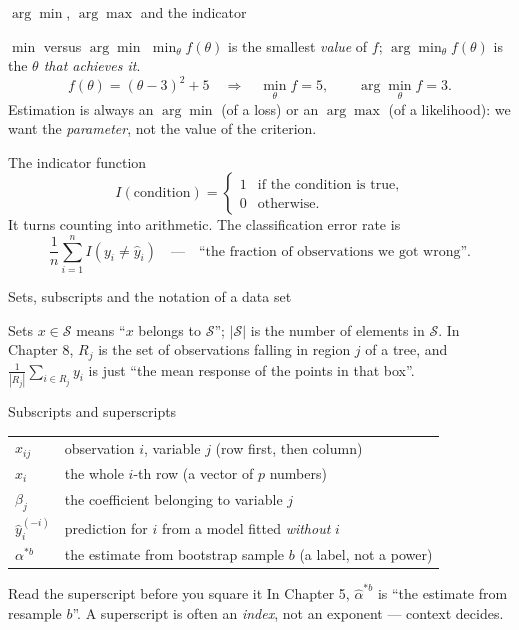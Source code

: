 \documentclass[aspectratio=169,11pt]{beamer}
\begin{document}
\begin{frame}{$\arg\min$, $\arg\max$ and the indicator}
  \footnotesize
  \begin{block}{$\min$ versus $\arg\min$}
    $\min_\theta f(\theta)$ is the smallest \emph{value} of $f$;
    $\arg\min_\theta f(\theta)$ is the \emph{$\theta$ that achieves it}.
    \[
      f(\theta) = (\theta-3)^2 + 5
      \quad\Longrightarrow\quad
      \min_\theta f = 5, \qquad \arg\min_\theta f = 3 .
    \]
    Estimation is always an $\arg\min$ (of a loss) or an $\arg\max$ (of a
    likelihood): we want the \emph{parameter}, not the value of the criterion.
  \end{block}
  \begin{block}{The indicator function}
    \[
      I(\text{condition}) =
      \begin{cases} 1 & \text{if the condition is true},\\ 0 & \text{otherwise.}\end{cases}
    \]
    It turns counting into arithmetic. The classification error rate is
    \[
      \frac{1}{n}\sum_{i=1}^{n} I(y_i \ne \hat y_i)
      \quad\text{---}\quad
      \text{``the fraction of observations we got wrong''.}
    \]
  \end{block}
\end{frame}

\begin{frame}{Sets, subscripts and the notation of a data set}
  \footnotesize
  \begin{block}{Sets}
    $x \in \mathcal{S}$ means ``$x$ belongs to $\mathcal{S}$'';
    $|\mathcal{S}|$ is the number of elements in $\mathcal{S}$.
    In Chapter 8, $R_j$ is the set of observations falling in region $j$ of a
    tree, and $\frac{1}{|R_j|}\sum_{i \in R_j} y_i$ is just ``the mean response
    of the points in that box''.
  \end{block}
  \begin{block}{Subscripts and superscripts}
    \begin{tabular}{@{}ll@{}}
      $x_{ij}$ & observation $i$, variable $j$ (row first, then column) \\
      $x_i$ & the whole $i$-th row (a vector of $p$ numbers) \\
      $\beta_j$ & the coefficient belonging to variable $j$ \\
      $\hat y_i^{(-i)}$ & prediction for $i$ from a model fitted \emph{without} $i$ \\
      $\alpha^{*b}$ & the estimate from bootstrap sample $b$ (a label, not a power) \\
    \end{tabular}
  \end{block}
  \begin{alertblock}{Read the superscript before you square it}
    In Chapter 5, $\hat\alpha^{*b}$ is ``the estimate from resample $b$''.
    A superscript is often an \emph{index}, not an exponent --- context decides.
  \end{alertblock}
\end{frame}
\end{document}
